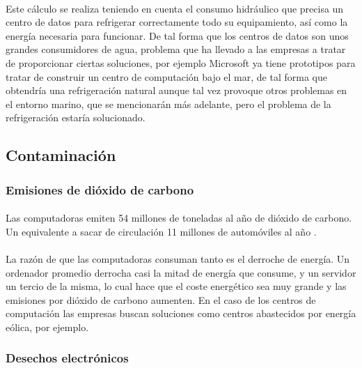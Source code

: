 \documentclass[12pt]{article}
\begin{document}
        \paragraph{}
        Este cálculo se realiza teniendo en cuenta el consumo hidráulico que precisa un centro de datos para refrigerar correctamente todo su equipamiento, así como la energía necesaria para funcionar. De tal forma que los centros de datos son unos grandes consumidores de agua, problema que ha llevado a las empresas a tratar de proporcionar ciertas soluciones, por ejemplo Microsoft ya tiene prototipos para tratar de construir un centro de computación bajo el mar, de tal forma que obtendría una refrigeración natural aunque tal vez provoque otros problemas en el entorno marino, que se mencionarán más adelante, pero el problema de la refrigeración estaría solucionado.
        
	  \subsection{Contaminación}
        
        \subsubsection{Emisiones de dióxido de carbono}
			\paragraph{}
       		 Las computadoras emiten 54 millones de toneladas al año de dióxido de carbono. Un equivalente a sacar de circulación 11 millones de automóviles al año \cite{J.rocha: i-medioAmbiente}.
        
        	\paragraph{}
        	La razón de que las computadoras consuman tanto es el derroche de energía. Un ordenador promedio derrocha casi la mitad de energía que consume, y un servidor un tercio de la misma, lo cual hace que el coste energético sea muy grande y las emisiones por dióxido de carbono aumenten. En el caso de los centros de computación las empresas buscan soluciones como centros abastecidos por energía eólica, por ejemplo.
            
        \subsubsection{Desechos electrónicos}
\end{document}

